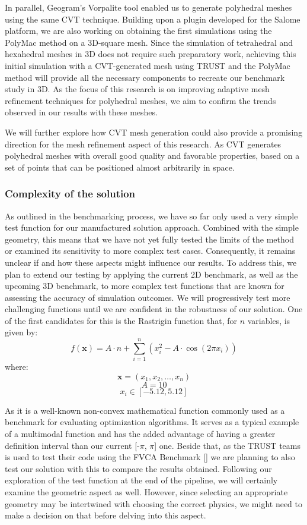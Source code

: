 \documentclass{article}
\begin{document}
In parallel, Geogram's Vorpalite tool enabled us to generate polyhedral meshes using the same CVT technique. Building upon a plugin developed for the Salome platform, we are also working on obtaining the first simulations using the PolyMac method on a 3D-square mesh. Since the simulation of tetrahedral and hexahedral meshes in 3D does not require such preparatory work, achieving this initial simulation with a CVT-generated mesh using TRUST and the PolyMac method will provide all the necessary components to recreate our benchmark study in 3D. As the focus of this research is on improving adaptive mesh refinement techniques for polyhedral meshes, we aim to confirm the trends observed in our results with these meshes.

We will further explore how CVT mesh generation could also provide a promising direction for the mesh refinement aspect of this research. As CVT generates polyhedral meshes with overall good quality and favorable properties, based on a set of points that can be positioned almost arbitrarily in space.

\subsubsection{Complexity of the solution}
As outlined in the benchmarking process, we have so far only used a very simple test function for our manufactured solution approach. Combined with the simple geometry, this means that we have not yet fully tested the limits of the method or examined its sensitivity to more complex test cases. Consequently, it remains unclear if and how these aspects might influence our results. To address this, we plan to extend our testing by applying the current 2D benchmark, as well as the upcoming 3D benchmark, to more complex test functions that are known for assessing the accuracy of simulation outcomes. We will progressively test more challenging functions until we are confident in the robustness of our solution. One of the first candidates for this is the Rastrigin function that, for \(n\) variables, is given by:
\[
f(\mathbf{x}) = A \cdot n + \sum_{i=1}^{n} \left( x_i^2 - A \cdot \cos(2 \pi x_i) \right)
\]
where:
\[
\mathbf{x} = (x_1, x_2, \dots, x_n)
\]
\[
A = 10
\]
\[
x_i \in [-5.12, 5.12]
\]

As it is a well-known non-convex mathematical function commonly used as a benchmark for evaluating optimization algorithms. It serves as a typical example of a multimodal function and has the added advantage of having a greater definition interval than our current [-\(\pi\), \(\pi\)] one. Beside that, as the TRUST teams is used to test their code using the FVCA Benchmark [] we are planning to also test our solution with this to compare the results obtained.
Following our exploration of the test function at the end of the pipeline, we will certainly examine the geometric aspect as well. However, since selecting an appropriate geometry may be intertwined with choosing the correct physics, we might need to make a decision on that before delving into this aspect.
\end{document}
